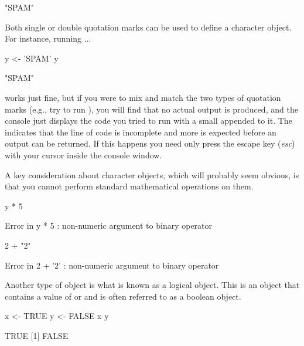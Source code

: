 \begin{outR}
[1] "SPAM"
\end{outR}

\noindent
Both single or double quotation marks can be used to define a character object. For instance, running ...

\begin{inR}
y <- 'SPAM'
y
\end{inR}

\begin{outR}
[1] "SPAM"
\end{outR}

\noindent
works just fine, but if you were to mix and match the two types of quotation marks (e.g., try to run ), you will find that no actual output is produced, and the console just displays the code you tried to run with a small \R{+} appended to it. The \R{+} indicates that the line of code is incomplete and more is expected before an output can be returned. If this happens you need only press the escape key (\textit{esc}) with your cursor inside the console window.

A key consideration about character objects, which will probably seem obvious, is that you cannot perform standard mathematical operations on them.

\begin{inR}
y * 5
\end{inR}

\begin{outR}
Error in y * 5 : non-numeric argument to binary operator
\end{outR}

\begin{inR}
2 + "2"
\end{inR}

\begin{outR}
Error in 2 + '2' : non-numeric argument to binary operator
\end{outR}

Another type of object is what is known as a \gls{logical} object.  This is an object that contains a value of  or  and is often referred to as a \gls{boolean} object.

\begin{inR}
x <- TRUE
y <- FALSE
x
y
\end{inR}

\begin{outR}
[1] TRUE
[1] FALSE
\end{outR}

